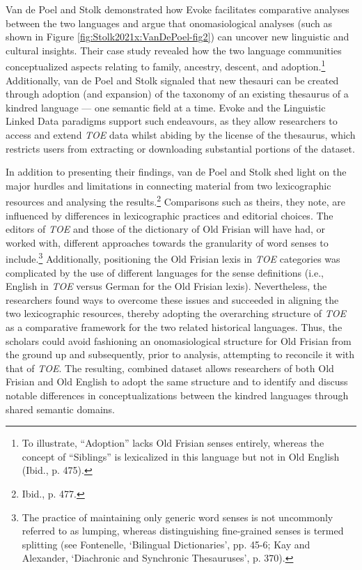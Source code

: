 Van de Poel and Stolk demonstrated how Evoke facilitates comparative analyses between the two languages and argue that onomasiological analyses (such as shown in Figure \ref{fig:Stolk2021x:VanDePoel-fig2}) can uncover new linguistic and cultural insights. Their case study revealed how the two language communities conceptualized aspects relating to family, ancestry, descent, and adoption.\footnote{To illustrate, ``Adoption'' lacks Old Frisian senses entirely, whereas the concept of ``Siblings'' is lexicalized in this language but not in Old English (Ibid., p. 475).} 
Additionally, van de Poel and Stolk signaled that new thesauri can be created through adoption (and expansion) of the taxonomy of an existing thesaurus of a kindred language --- one semantic field at a time. 
Evoke and the Linguistic Linked Data paradigms support such endeavours, as they allow researchers to access and extend \textit{TOE} data whilst abiding by the license of the thesaurus, which restricts users from extracting or downloading substantial portions of the dataset.

In addition to presenting their findings, van de Poel and Stolk shed light on the major hurdles and limitations in connecting material from two lexicographic resources and analysing the results.\footnote{Ibid., p. 477.} 
Comparisons such as theirs, they note, are influenced by differences in lexicographic practices and editorial choices. The editors of \textit{TOE} and those of the dictionary of Old Frisian will have had, or worked with, different approaches towards the granularity of word senses to include.\footnote{The practice of maintaining only generic word senses is not uncommonly referred to as lumping, whereas distinguishing fine-grained senses is termed splitting (see Fontenelle, `Bilingual Dictionaries', pp. 45-6; Kay and Alexander, `Diachronic and Synchronic Thesauruses', p. 370).} Additionally, positioning the Old Frisian lexis in \textit{TOE} categories was complicated by the use of different languages for the sense definitions (i.e., English in \textit{TOE} versus German for the Old Frisian lexis). Nevertheless, the researchers found ways to overcome these issues and succeeded in aligning the two lexicographic resources, thereby adopting the overarching structure of \textit{TOE} as a comparative framework for the two related historical languages. Thus, the scholars could avoid fashioning an onomasiological structure for Old Frisian from the ground up and subsequently, prior to analysis, attempting to reconcile it with that of \textit{TOE}. The resulting, combined dataset allows researchers of both Old Frisian and Old English to adopt the same structure and to identify and discuss notable differences in conceptualizations between the kindred languages through shared semantic domains. 

